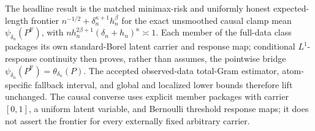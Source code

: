 The headline result is the matched minimax-risk and uniformly honest expected-length frontier \(n^{-1/2}+\delta_n^{\kappa+1}h_n^\beta\) for the exact unsmoothed causal clamp mean \(\psi_{\delta_n}(P^{\mathrm F})\), with \(n h_n^{2\beta+1}(\delta_n+h_n)^\kappa\asymp1\). Each member of the full-data class packages its own standard-Borel latent carrier and response map; conditional \(L^1\)-response continuity then proves, rather than assumes, the pointwise bridge \(\psi_{\delta_n}(P^{\mathrm F})=\theta_{\delta_n}(P)\). The accepted observed-data total-Gram estimator, atom-specific fallback interval, and global and localized lower bounds therefore lift unchanged. The causal converse uses explicit member packages with carrier \([0,1]\), a uniform latent variable, and Bernoulli threshold response maps; it does not assert the frontier for every externally fixed arbitrary carrier.